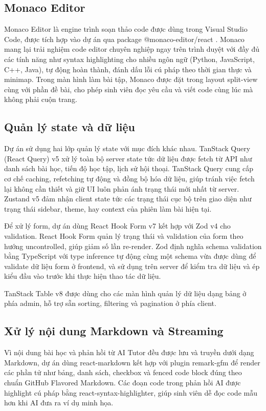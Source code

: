 \documentclass[../main.tex]{subfiles}
\begin{document}
\subsection{Monaco Editor}

Monaco Editor là engine trình soạn thảo code được dùng trong Visual Studio Code, được tích hợp vào dự án qua package @monaco-editor/react \cite{microsoft2024monaco}. Monaco mang lại trải nghiệm code editor chuyên nghiệp ngay trên trình duyệt với đầy đủ các tính năng như syntax highlighting cho nhiều ngôn ngữ (Python, JavaScript, C++, Java), tự động hoàn thành, đánh dấu lỗi cú pháp theo thời gian thực và minimap. Trong màn hình làm bài tập, Monaco được đặt trong layout split-view cùng với phần đề bài, cho phép sinh viên đọc yêu cầu và viết code cùng lúc mà không phải cuộn trang.

\subsection{Quản lý state và dữ liệu}

Dự án sử dụng hai lớp quản lý state với mục đích khác nhau. TanStack Query (React Query) v5 xử lý toàn bộ server state tức dữ liệu được fetch từ API như danh sách bài học, tiến độ học tập, lịch sử hội thoại. TanStack Query cung cấp cơ chế caching, refetching tự động và đồng bộ hóa dữ liệu, giúp tránh việc fetch lại không cần thiết và giữ UI luôn phản ánh trạng thái mới nhất từ server. Zustand v5 đảm nhận client state tức các trạng thái cục bộ trên giao diện như trạng thái sidebar, theme, hay context của phiên làm bài hiện tại.

Để xử lý form, dự án dùng React Hook Form v7 kết hợp với Zod v4 cho validation. React Hook Form quản lý trạng thái và validation của form theo hướng uncontrolled, giúp giảm số lần re-render. Zod định nghĩa schema validation bằng TypeScript với type inference tự động cùng một schema vừa được dùng để validate dữ liệu form ở frontend, và sử dụng trên server để kiểm tra dữ liệu và ép kiểu đầu vào trước khi thực hiện thao tác dữ liệu.

TanStack Table v8 được dùng cho các màn hình quản lý dữ liệu dạng bảng ở phía admin, hỗ trợ sẵn sorting, filtering và pagination ở phía client.

\subsection{Xử lý nội dung Markdown và Streaming}

Vì nội dung bài học và phản hồi từ AI Tutor đều được lưu và truyền dưới dạng Markdown, dự án dùng react-markdown kết hợp với plugin remark-gfm để render các phần tử như bảng, danh sách, checkbox và fenced code block đúng theo chuẩn GitHub Flavored Markdown. Các đoạn code trong phản hồi AI được highlight cú pháp bằng react-syntax-highlighter, giúp sinh viên dễ đọc code mẫu hơn khi AI đưa ra ví dụ minh họa.
\end{document}

